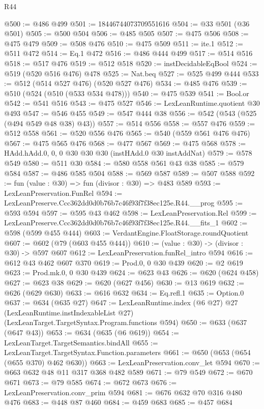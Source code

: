 \begin{lexlean}{R44}
\begin{coremodule}
@500 := @486 @499
@501 := 18446744073709551616
@504 := @33 @501 (@36 @501)
@505 := @500 @504
@506 := @485 @505
@507 := @475 @506
@508 := @475 @479
@509 := @508 @476
@510 := @475 @509
@511 := ite.{1}
@512 := @511 @472
@514 := Eq.{1} @472
@516 := @486 @444 @499
@517 := @514 @516
@518 := @517 @476
@519 := @512 @518
@520 := instDecidableEqBool
@524 := @519 (@520 @516 @476) @478
@525 := Nat.beq
@527 := @525 @499 @444
@533 := @512 (@514 @527 @476) (@520 @527 @476)
@534 := @485 @476
@539 := @510 (@524 (@510 (@533 @534 @478)))
@540 := @475 @539
@541 := Bool.or
@542 := @541 @516
@543 := @475 @527
@546 := LexLeanRuntime.quotient @30 @493
@547 := @546 @455
@549 := @547 @444 @38
@556 := @542 (@543 (@525 (@494 @549 @48 @38) @43))
@557 := @514 @556
@558 := @557 @476
@559 := @512 @558
@561 := @520 @556 @476
@565 := @540 (@559 @561 @476 @476)
@567 := @475 @565 @476
@568 := @477 @567
@569 := @475 @568
@578 := HAdd.hAdd.{0, 0, 0} @30 @30 @30 (instHAdd.{0} @30 instAddNat)
@579 := @578 @549
@580 := @511 @30
@584 := @580 @558 @561 @43 @38
@585 := @579 @584
@587 := @486 @585 @504
@588 := @569 @587
@589 := @507 @588
@592 := fun (value : @30) => fun (divisor : @30) => @483 @589
@593 := LexLeanPreservation.FunRel
@594 := LexLeanPreserve.Ccc362dd0d0b76b7c46f93f7f38ec125e.R44.__prog
@595 := @593 @594
@597 := @595 @43 @462
@598 := LexLeanPreservation.Rel
@599 := LexLeanPreserve.Ccc362dd0d0b76b7c46f93f7f38ec125e.R44.__fits_1
@602 := @598 (@599 @455 @444)
@603 := VerdantEngine.FloatStorage.roundQuotient
@607 := @602 (@79 (@603 @455 @444))
@610 := (value : @30) -> (divisor : @30) -> @597 @607
@612 := LexLeanPreservation.funRel_intro @594
@616 := @612 @43 @462 @607 @370
@619 := Prod.{0, 0} @30 @439
@620 := @2 @619
@623 := Prod.mk.{0, 0} @30 @439
@624 := @623 @43
@626 := @620 (@624 @458)
@627 := @623 @38
@629 := @620 (@627 @456)
@630 := @13 @619
@632 := @626 (@629 @630)
@633 := @616 @632
@634 := Eq.refl.{1}
@635 := Option.{0}
@637 := @634 (@635 @27)
@647 := LexLeanRuntime.index
    (@6 @27)
    @27
    (LexLeanRuntime.instIndexableList @27)
    (LexLeanTarget.TargetSyntax.Program.functions @594)
@650 := @633 (@637 (@647 @43))
@653 := @634 (@635 (@6 @619))
@654 := LexLeanTarget.TargetSemantics.bindAll
@655 := LexLeanTarget.TargetSyntax.Function.parameters
@661 := @650 (@653 (@654 (@655 @370) @462 @630))
@663 := LexLeanPreservation.conv_let @594
@670 := @663 @632 @48 @11 @317 @368 @482 @589
@671 := @79 @549
@672 := @670 @671
@673 := @79 @585
@674 := @672 @673
@676 := LexLeanPreservation.conv_prim @594
@681 := @676 @632 @70 @316 @480 @476
@683 := @448 @87 @460
@684 := @459 @683
@685 := @457 @684

\end{coremodule}
\end{lexlean}
